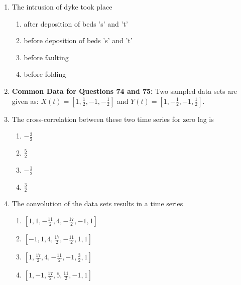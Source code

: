 \documentclass[journal,12pt,onecolumn]{IEEEtran}
\theoremstyle{remark}
\begin{document}
\begin{enumerate}
\newpage

    \item The intrusion of dyke took place

    \hfill{}
    
    \begin{multicols}{2}
        \begin{enumerate}
            \item after deposition of beds 's' and 't'
            \item before deposition of beds 's' and 't'
            \item before faulting
            \item before folding
        \end{enumerate}
    \end{multicols}

    \item[] \textbf{Common Data for Questions 74 and 75:} Two sampled data sets are given as: $X(t) = [1, \frac{1}{2}, -1, -\frac{1}{2}]$ and $Y(t) = [1, -\frac{1}{2}, -1, \frac{1}{2}]$.
    
    \item The cross-correlation between these two time series for zero lag is

    \hfill{}
    
    \begin{multicols}{4}
        \begin{enumerate}
            \item $-\frac{3}{2}$
            \item $\frac{5}{2}$
            \item $-\frac{1}{2}$
            \item $\frac{3}{2}$
        \end{enumerate}
    \end{multicols}

    \item The convolution of the data sets results in a time series

    \hfill{}
    
    \begin{multicols}{2}
        \begin{enumerate}
            \item $[1, 1, -\frac{11}{2}, 4, -\frac{17}{2}, -1, 1]$
            \item $[-1, 1, 4, \frac{17}{2}, -\frac{11}{2}, 1, 1]$
            \item $[1, \frac{17}{2}, 4, -\frac{11}{2}, -1, \frac{3}{2}, 1]$
            \item $[1, -1, \frac{17}{2}, 5, \frac{11}{2}, -1, 1]$
        \end{enumerate}
    \end{multicols}




\end{enumerate}
\end{document}
